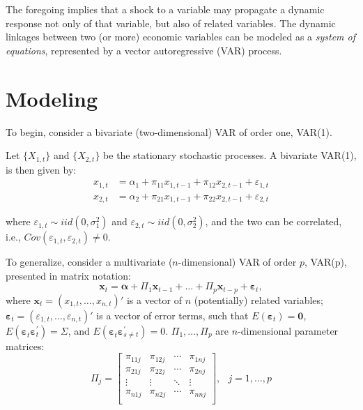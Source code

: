 \documentclass[
  oneside]{book}
\begin{document}
The foregoing implies that a shock to a variable may propagate a dynamic response not only of that variable, but also of related variables. The dynamic linkages between two (or more) economic variables can be modeled as a \emph{system of equations}, represented by a vector autoregressive (VAR) process.

\hypertarget{modeling-3}{%
\section{Modeling}\label{modeling-3}}

To begin, consider a bivariate (two-dimensional) VAR of order one, VAR(1).

Let \(\{X_{1,t}\}\) and \(\{X_{2,t}\}\) be the stationary stochastic processes. A bivariate VAR(1), is then given by:
\[\begin{aligned}
x_{1,t} &= \alpha_1 + \pi_{11}x_{1,t-1} + \pi_{12}x_{2,t-1} + \varepsilon_{1,t} \\
x_{2,t} &= \alpha_2 + \pi_{21}x_{1,t-1} + \pi_{22}x_{2,t-1} + \varepsilon_{2,t}
\end{aligned}\]

where \(\varepsilon_{1,t} \sim iid(0,\sigma_1^2)\) and \(\varepsilon_{2,t} \sim iid(0,\sigma_2^2)\), and the two can be correlated, i.e., \(Cov(\varepsilon_{1,t},\varepsilon_{2,t}) \neq 0\).

To generalize, consider a multivariate (\(n\)-dimensional) VAR of order \(p\), VAR(p), presented in matrix notation: \[\mathbf{x}_t = \mathbf{\alpha} + \Pi_1 \mathbf{x}_{t-1} + \ldots + \Pi_p \mathbf{x}_{t-p} + \mathbf{\varepsilon}_t,\] where \(\mathbf{x}_t = (x_{1,t},\ldots,x_{n,t})'\) is a vector of \(n\) (potentially) related variables; \(\mathbf{\varepsilon}_t = (\varepsilon_{1,t},\ldots,\varepsilon_{n,t})'\) is a vector of error terms, such that \(E(\mathbf{\varepsilon}_t) = \mathbf{0}\), \(E(\mathbf{\varepsilon}_t^{}\mathbf{\varepsilon}_t^{\prime}) = \Sigma\), and \(E(\mathbf{\varepsilon}_{t}^{}\mathbf{\varepsilon}_{s \neq t}^{\prime}) = 0\). \(\Pi_1,\ldots,\Pi_p\) are \(n\)-dimensional parameter matrices:
\[\Pi_j = 
        \left[ 
        \begin{array}{cccc} 
        \pi_{11j} & \pi_{12j} & \cdots &  \pi_{1nj} \\ 
        \pi_{21j} & \pi_{22j} & \cdots &  \pi_{2nj} \\  
        \vdots & \vdots & \ddots &  \vdots \\  
        \pi_{n1j} & \pi_{n2j} & \cdots &  \pi_{nnj} \\  
        \end{array} 
        \right],\;~~j=1,\ldots,p\]
\end{document}
